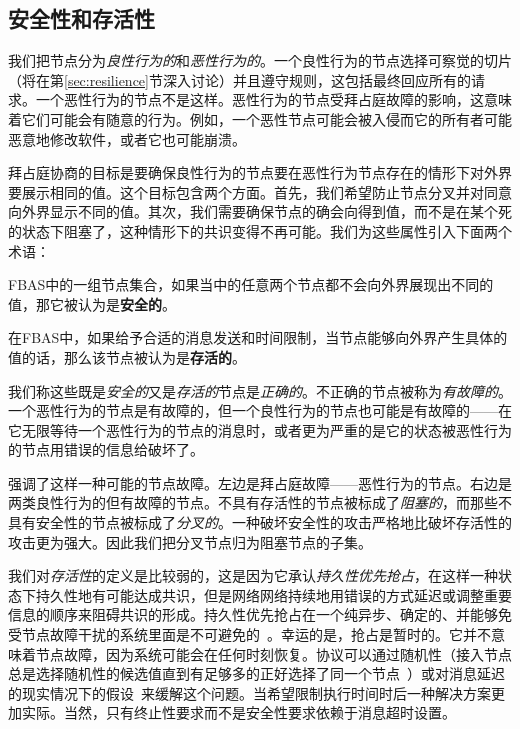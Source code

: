 \subsection{安全性和存活性}\label{sec:fba-safe-live}

我们把节点分为\textit{良性行为的}和\textit{恶性行为的}。一个良性行为的节点选择可察觉的{\quorum}切片（将在第\ref{sec:resilience}节深入讨论）并且遵守规则，这包括最终回应所有的请求。一个恶性行为的节点不是这样。恶性行为的节点受拜占庭故障的影响，这意味着它们可能会有随意的行为。例如，一个恶性节点可能会被入侵而它的所有者可能恶意地修改软件，或者它也可能崩溃。

拜占庭协商的目标是要确保良性行为的节点要在恶性行为节点存在的情形下对外界要展示相同的值。这个目标包含两个方面。首先，我们希望防止节点分叉并对同意{\slot}向外界显示不同的值。其次，我们需要确保节点的确会向得到值，而不是在某个死的状态下阻塞了，这种情形下的共识变得不再可能。我们为这些属性引入下面两个术语：

\begin{definition}[安全性]
	FBAS中的一组节点集合，如果当中的任意两个节点都不会向外界展现出不同的值，那它被认为是{\textbf{安全的}}。
\end{definition}

\begin{definition}[存活性]
	在FBAS中，如果给予合适的消息发送和时间限制，当节点能够向外界产生具体的值的话，那么该节点被认为是{\textbf{存活的}}。
\end{definition}

我们称这些既是\textit{安全的}又是\textit{存活的}节点是\textit{正确的}。不正确的节点被称为{\textit{有故障的}}。一个恶性行为的节点是有故障的，但一个良性行为的节点也可能是有故障的——在它无限等待一个恶性行为的节点的消息时，或者更为严重的是它的状态被恶性行为的节点用错误的信息给破坏了。

强调了这样一种可能的节点故障。左边是拜占庭故障——恶性行为的节点。右边是两类良性行为的但有故障的节点。不具有存活性的节点被标成了\textit{阻塞的}，而那些不具有安全性的节点被标成了\textit{分叉的}。一种破坏安全性的攻击严格地比破坏存活性的攻击更为强大。因此我们把分叉节点归为阻塞节点的子集。

我们对\textit{存活性}的定义是比较弱的，这是因为它承认\textit{持久性优先抢占}，在这样一种状态下持久性地有可能达成共识，但是网络网络持续地用错误的方式延迟或调整重要信息的顺序来阻碍共识的形成。持久性优先抢占在一个纯异步、确定的、并能够免受节点故障干扰的系统里面是不可避免的~\cite{Fischer:1985:IDC:3149.214121}。幸运的是，抢占是暂时的。它并不意味着节点故障，因为系统可能会在任何时刻恢复。协议可以通过随机性（接入节点总是选择随机性的候选值直到有足够多的正好选择了同一个节点~\cite{Ben-Or:1983:AFC:800221.806707,Bracha:1985:ACB:4221.214134}）或对消息延迟的现实情况下的假设~\cite{Dwork:1988:CPP:42282.42283}来缓解这个问题。当希望限制执行时间时后一种解决方案更加实际。当然，只有终止性要求而不是安全性要求依赖于消息超时设置。


